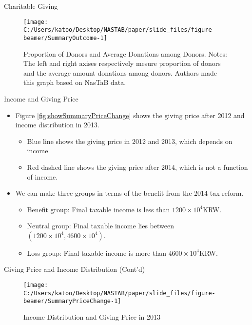 \documentclass[
  ignorenonframetext,
  aspectratio=169]{beamer}
\providecommand{\tightlist}{%
  \setlength{\itemsep}{0pt}\setlength{\parskip}{0pt}}
\begin{document}
\begin{frame}{Charitable Giving}
\protect\hypertarget{charitable-giving}{}
\begin{figure}[t]

{\centering \texttt{[image: C:/Users/katoo/Desktop/NASTAB/paper/slide\_files/figure-beamer/SummaryOutcome-1]} 

}

\caption{Proportion of Donors and Average Donations among Donors. Notes: The left and right axises respectively mesure proportion of donors and the average amount donations among donors. Authors made this graph based on NasTaB data.}\label{fig:SummaryOutcome}
\end{figure}
\end{frame}

\begin{frame}{Income and Giving Price}
\protect\hypertarget{income-and-giving-price}{}
\begin{itemize}
\tightlist
\item
  Figure \ref{fig:showSummaryPriceChange} shows the giving price after 2012 and income distribution in 2013.

  \begin{itemize}
  \tightlist
  \item
    Blue line shows the giving price in 2012 and 2013, which depends on income
  \item
    Red dashed line shows the giving price after 2014, which is not a function of income.
  \end{itemize}
\item
  We can make three groups in terms of the benefit from the 2014 tax reform.

  \begin{itemize}
  \tightlist
  \item
    Benefit group: Final taxable income is less than \(1200 \times 10^4\)KRW.
  \item
    Neutral group: Final taxable income lies between \((1200 \times 10^4, 4600 \times 10^4)\).
  \item
    Loss group: Final taxable income is more than \(4600 \times 10^4\)KRW.
  \end{itemize}
\end{itemize}
\end{frame}

\begin{frame}{Giving Price and Income Distribution (Cont'd)}
\protect\hypertarget{giving-price-and-income-distribution-contd}{}
\begin{figure}[t]

{\centering \texttt{[image: C:/Users/katoo/Desktop/NASTAB/paper/slide\_files/figure-beamer/SummaryPriceChange-1]} 

}

\caption{Income Distribution and Giving Price in 2013}\label{fig:SummaryPriceChange}
\end{figure}

\clearpage
\end{frame}
\end{document}
